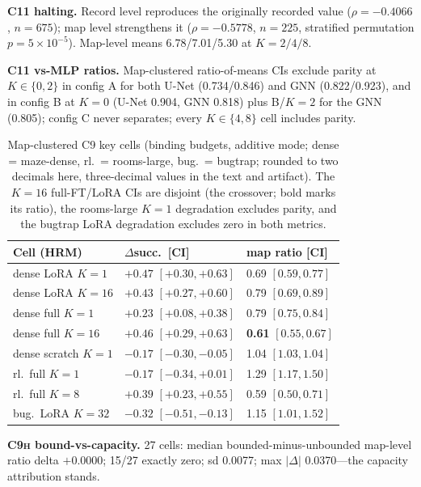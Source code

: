 \documentclass[letterpaper]{article} %
\newcommand{\stage}[1]{\textsc{#1}}
\begin{document}
\textbf{\stage{C11} halting.} Record level reproduces the originally recorded value ($\rho{=}-0.4066$, $n{=}675$); map level strengthens it ($\rho{=}-0.5778$, $n{=}225$, stratified permutation $p{=}5{\times}10^{-5}$). Map-level means 6.78/7.01/5.30 at $K{=}2/4/8$.

\textbf{\stage{C11} vs-MLP ratios.} Map-clustered ratio-of-means CIs exclude parity at $K\in\{0,2\}$ in config A for both U-Net (0.734/0.846) and GNN (0.822/0.923), and in config B at $K{=}0$ (U-Net 0.904, GNN 0.818) plus B/$K{=}2$ for the GNN (0.805); config C never separates; every $K\in\{4,8\}$ cell includes parity.

\begin{table}[t]
\centering
\small
\setlength{\tabcolsep}{1.5pt}
\begin{tabular}{@{}lll@{}}
\toprule
Cell (HRM) & $\Delta$succ.\ [CI] & map ratio [CI] \\
\midrule
dense LoRA $K{=}1$ & $+0.47$ $[+0.30,+0.63]$ & 0.69 $[0.59,0.77]$ \\
dense LoRA $K{=}16$ & $+0.43$ $[+0.27,+0.60]$ & 0.79 $[0.69,0.89]$ \\
dense full $K{=}1$ & $+0.23$ $[+0.08,+0.38]$ & 0.79 $[0.75,0.84]$ \\
dense full $K{=}16$ & $+0.46$ $[+0.29,+0.63]$ & \textbf{0.61} $[0.55,0.67]$ \\
dense scratch $K{=}1$ & $-0.17$ $[-0.30,-0.05]$ & 1.04 $[1.03,1.04]$ \\
rl.\ full $K{=}1$ & $-0.17$ $[-0.34,+0.01]$ & 1.29 $[1.17,1.50]$ \\
rl.\ full $K{=}8$ & $+0.39$ $[+0.23,+0.55]$ & 0.59 $[0.50,0.71]$ \\
bug.\ LoRA $K{=}32$ & $-0.32$ $[-0.51,-0.13]$ & 1.15 $[1.01,1.52]$ \\
\bottomrule
\end{tabular}
\caption{Map-clustered \stage{C9} key cells (binding budgets, additive mode; dense = maze-dense, rl.\ = rooms-large, bug.\ = bugtrap; rounded to two decimals here, three-decimal values in the text and artifact). The $K{=}16$ full-FT/LoRA CIs are disjoint (the crossover; bold marks its ratio), the rooms-large $K{=}1$ degradation excludes parity, and the bugtrap LoRA degradation excludes zero in both metrics.}
\label{tab:wcr-c9}
\end{table}

\textbf{\stage{C9h} bound-vs-capacity.} 27 cells: median bounded-minus-unbounded map-level ratio delta $+0.0000$; 15/27 exactly zero; sd 0.0077; max $|\Delta|$ 0.0370---the capacity attribution stands.
\end{document}

